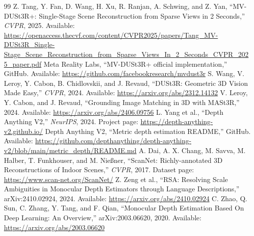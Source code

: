 \documentclass[12pt,a4paper]{article}
\begin{document}
\newpage
\begin{thebibliography}{99}
 Z. Tang, Y. Fan, D. Wang, H. Xu, R. Ranjan, A. Schwing, and Z. Yan, ``MV-DUSt3R+: Single-Stage Scene Reconstruction from Sparse Views in 2 Seconds,'' \textit{CVPR}, 2025. Available: \url{https://openaccess.thecvf.com/content/CVPR2025/papers/Tang_MV-DUSt3R_Single-Stage_Scene_Reconstruction_from_Sparse_Views_In_2_Seconds_CVPR_2025_paper.pdf}
 Meta Reality Labs, ``MV-DUSt3R+ official implementation,'' GitHub. Available: \url{https://github.com/facebookresearch/mvdust3r}
 S. Wang, V. Leroy, Y. Cabon, B. Chidlovskii, and J. Revaud, ``DUSt3R: Geometric 3D Vision Made Easy,'' \textit{CVPR}, 2024. Available: \url{https://arxiv.org/abs/2312.14132}
 V. Leroy, Y. Cabon, and J. Revaud, ``Grounding Image Matching in 3D with MASt3R,'' 2024. Available: \url{https://arxiv.org/abs/2406.09756}
 L. Yang et al., ``Depth Anything V2,'' \textit{NeurIPS}, 2024. Project page: \url{https://depth-anything-v2.github.io/}
 Depth Anything V2, ``Metric depth estimation README,'' GitHub. Available: \url{https://github.com/depthanything/depth-anything-v2/blob/main/metric_depth/README.md}
 A. Dai, A. X. Chang, M. Savva, M. Halber, T. Funkhouser, and M. Nießner, ``ScanNet: Richly-annotated 3D Reconstructions of Indoor Scenes,'' \textit{CVPR}, 2017. Dataset page: \url{https://www.scan-net.org/ScanNet/}
 Z. Zeng et al., ``RSA: Resolving Scale Ambiguities in Monocular Depth Estimators through Language Descriptions,'' arXiv:2410.02924, 2024. Available: \url{https://arxiv.org/abs/2410.02924}
 C. Zhao, Q. Sun, C. Zhang, Y. Tang, and F. Qian, ``Monocular Depth Estimation Based On Deep Learning: An Overview,'' arXiv:2003.06620, 2020. Available: \url{https://arxiv.org/abs/2003.06620}
\end{thebibliography}
\end{document}
